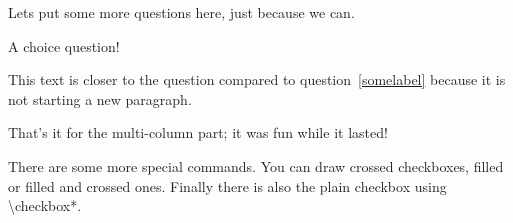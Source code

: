 \documentclass[
  english,
  pagemark,
  stamp]{sdaps}
\begin{document}
\begin{questionnaire}
\begin{multicols}{2}
      Lets put some more questions here, just because we can.

      \begin{choicequestion}[1]{A choice question!}
      \end{choicequestion}

      This text is closer to the question compared to question~\ref{somelabel}
      because it is not starting a new paragraph.


    \end{multicols}

    That's it for the multi-column part; it was fun while it lasted!

    There are some more special commands. You can draw \checkedbox{} crossed
    checkboxes, \filledbox{} filled or \correctedbox{} filled and crossed ones. Finally there is
    also the plain \checkbox*{} checkbox using {\ttfamily \textbackslash{}checkbox*}.


    \def\checkboxstyle{box}

  \end{questionnaire}
\end{document}
